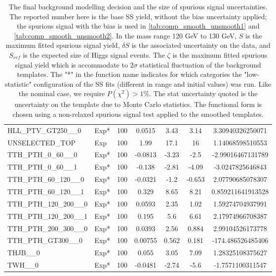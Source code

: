 \begin{table}[!h]
{\begin{tabular}{llccccS[table-format = 3.2, round-mode = places, round-precision = 2]}
 HLL\_PTV\_GT250\_\_0 &Exp*&100&0.0515&3.43&3.14&3.30940326250071\\
 UNSELECTED\_TOP &Exp&100&1.99&17.1&16&1.14068598510553\\
 TTH\_PTH\_0\_60\_\_0 &Exp*&100&-0.0813&-3.23&-2.5&-2.99016467131789\\
 TTH\_PTH\_0\_60\_\_1 &Exp*&100&-0.138&-2.81&-4.09&-3.0247825646843\\
 TTH\_PTH\_60\_120\_\_0 &Exp*&100&-0.0321&-1.2&-0.653&2.07790685078307\\
 TTH\_PTH\_60\_120\_\_1 &Exp*&100&0.329&8.65&8.21&0.859211641913528\\
 TTH\_PTH\_120\_200\_\_0 &Exp*&100&0.0593&2.35&1.02&1.59274704937991\\
 TTH\_PTH\_120\_200\_\_1 &Exp*&100&0.195&5.6&6.61&2.17974966708387\\
 TTH\_PTH\_200\_300\_\_0 &Exp*&100&0.0393&2.56&0.884&2.99104526173778\\
 TTH\_PTH\_GT300\_\_0 &Exp*&100&0.00755&0.562&0.181&-174.486526485406\\
 THJB\_\_0 &Exp*&100&0.055&3.05&7.09&1.28325108375627\\
 TWH\_\_0 &Exp*&100&-0.0481&-2.74&-5.6&-1.7571100311547\\
       \hline
      \hline
      \end{tabular}
}
      \caption{
The final background modelling decision and the size of spurious signal uncertainties. The reported number here is the base SS yield, without the bias uncertainty applied; the spurious signal with the bias is used in \ref{tab:comp_smooth_unsmooth1} and \ref{tab:comp_smooth_unsmooth2}.
   In the mass range 120 GeV to 130 GeV, $S$ is the maximum fitted spurious signal yield, $\delta S$ is the associated uncertainty on the data, and $S_{ref}$ is the expected size of Higgs signal events.
   The $\zeta$ is the maximum fitted spurious signal yield which is accommodate to $2\sigma$ statistical fluctuation of the background templates.
   The "*" in the function name indicates for which categories the "low-statistic" configuration of the SS fits (different in range and initial values) was run.
   Like the nominal case, we require $P(\chi^2) > 1\%$. The stat uncertainty quoted is the uncertainty on the template due to Monte Carlo statistics. The functional form is chosen using a non-relaxed spurious signal test applied to the smoothed templates. 
   \label{tab:spurious_sig_gp2}   }   
\end{table}

